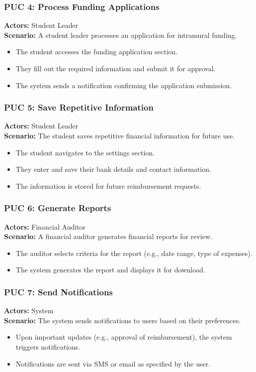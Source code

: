 \documentclass[12pt]{article}
\begin{document}
\subsubsection{PUC 4: Process Funding Applications}
\textbf{Actors:} Student Leader \\
\textbf{Scenario:} A student leader processes an application for intramural funding.
\begin{itemize}
    \item The student accesses the funding application section.
    \item They fill out the required information and submit it for approval.
    \item The system sends a notification confirming the application submission.
\end{itemize}

\subsubsection{PUC 5: Save Repetitive Information}
\textbf{Actors:} Student Leader \\
\textbf{Scenario:} The student saves repetitive financial information for future use.
\begin{itemize}
    \item The student navigates to the settings section.
    \item They enter and save their bank details and contact information.
    \item The information is stored for future reimbursement requests.
\end{itemize}

\subsubsection{PUC 6: Generate Reports}
\textbf{Actors:} Financial Auditor \\
\textbf{Scenario:} A financial auditor generates financial reports for review.
\begin{itemize}
    \item The auditor selects criteria for the report (e.g., date range, type of expenses).
    \item The system generates the report and displays it for download.
\end{itemize}

\subsubsection{PUC 7: Send Notifications}
\textbf{Actors:} System \\
\textbf{Scenario:} The system sends notifications to users based on their preferences.
\begin{itemize}
    \item Upon important updates (e.g., approval of reimbursement), the system triggers notifications.
    \item Notifications are sent via SMS or email as specified by the user.
\end{itemize}
\end{document}
